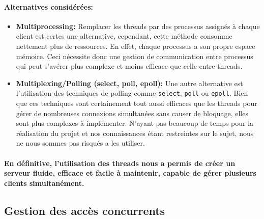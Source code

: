 \documentclass[utf8]{article}
\begin{document}
\paragraph{Alternatives considérées:}
\begin{itemize}
    \item \textbf{Multiprocessing:} Remplacer les threads par des processus assignés à chaque client est certes une alternative, cependant, cette méthode consomme nettement plus de ressources. En effet, chaque 
    processus a son propre espace mémoire. Ceci nécessite donc une gestion de communication entre processus qui peut s'avérer plus complexe et moins efficace que celle entre threads.
    \item \textbf{Multiplexing/Polling (select, poll, epoll):} Une autre alternative est l'utilisation des techniques de polling comme \texttt{select}, \texttt{poll} ou \texttt{epoll}. 
    Bien que ces techniques sont certainement tout aussi efficaces que les threads pour gérer de nombreuses connexions simultanées sans causer de bloquage, elles sont plus complexes à implémenter. N'ayant pas beaucoup de temps 
    pour la réalisation du projet et nos connaissances étant restreintes sur le sujet, nous ne nous sommes pas risqués a les utiliser.
\end{itemize}

\paragraph{En définitive, l'utilisation des threads nous a permis de créer un serveur fluide, efficace et facile à maintenir, capable de gérer plusieurs clients simultanément.}

\subsection{Gestion des accès concurrents}
\end{document}
